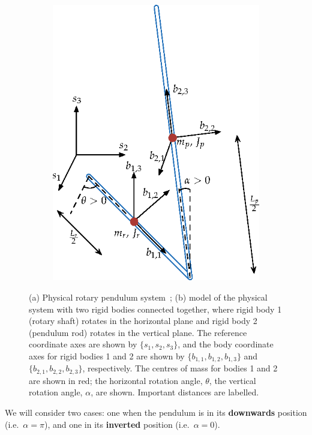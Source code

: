 \begin{figure}[H]
\begin{subfigure}{.4\textwidth}
        \includegraphics[width=\textwidth]{eps/lab_2/rotary_pendulum_edit.eps}
        \caption{}
    \end{subfigure}
    \caption{(a) Physical rotary pendulum system~\cite{Q-Flex-Beam}; (b) model of the physical system with two rigid bodies connected together, where rigid body 1 (rotary shaft) rotates in the horizontal plane and rigid body 2 (pendulum rod) rotates in the vertical plane. The reference coordinate axes are shown by $\{s_1,s_2,s_3\}$, and the body coordinate axes for rigid bodies 1 and 2 are shown by $\{b_{1,1},b_{1,2}, b_{1,3}\}$ and $\{b_{2,1},b_{2,2},b_{2,3}\}$, respectively. The centres of mass for bodies 1 and 2 are shown in red; the horizontal rotation angle, $\theta$, the vertical rotation angle, $\alpha$, are shown. Important distances are labelled.}
    \label{fig:lab2_rotary_pendulum}
\end{figure}

We will consider two cases: one when the pendulum is in its \textbf{downwards} position (i.e.\ \( \alpha=\pi \)), and one in its \textbf{inverted} position (i.e.\ \( \alpha=0 \)).

